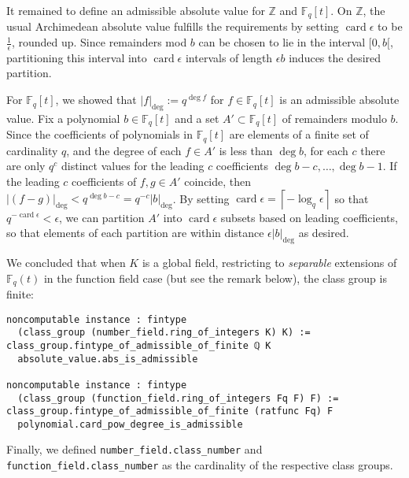 \documentclass[sn-mathphys]{sn-jnl}%
\newcommand{\lean}[1]{\texttt{#1}\xspace}
\newcommand*{\Fq}[1][q]{\mathbb{F}_{#1}}
\renewcommand{\Z}{\mathbb{Z}}
\begin{document}
It remained to define an admissible absolute value for $\Z$ and $\Fq[q][t]$. On $\Z$, the usual Archimedean absolute value fulfills the requirements
by setting $\operatorname{card} \epsilon$ to be $\frac{1}{\epsilon}$, rounded up.
Since remainders mod $b$ can be chosen to lie in the interval $[0, b[$, partitioning this interval into $\operatorname{card} \epsilon$ intervals of length $\epsilon b$ induces the desired partition.

For $\Fq[q][t]$, we showed that $\lvert f\rvert_{\deg}:=q^{\deg f}$ for $f \in \Fq[q][t]$ is an admissible absolute value.
Fix a polynomial $b \in \Fq[q][t]$ and a set $A' \subset \Fq[q][t]$ of remainders modulo $b$.
Since the coefficients of polynomials in $\Fq[q][t]$ are elements of a finite set of cardinality $q$,
and the degree of each $f \in A'$ is less than $\deg b$,
for each $c$ there are only $q^c$ distinct values for the leading $c$ coefficients $\deg b - c, \dots, \deg b - 1$.
If the leading $c$ coefficients of $f, g \in A'$ coincide, then $\lvert (f-g) \rvert_{\deg} < q^{\deg b - c} = q^{-c} \lvert b \rvert_{\deg}$.
By setting $\operatorname{card} \epsilon = \left\lceil{-\log_{q} \epsilon}\right\rceil$ so that $q^{- \operatorname{card} \epsilon} < \epsilon$,
we can partition $A'$ into $\operatorname{card} \epsilon$ subsets based on leading coefficients,
so that elements of each partition are within distance $\epsilon \lvert b \rvert_{\deg}$ as desired.

We concluded that when $K$ is a global field, restricting to \emph{separable} extensions of $\Fq[q](t)$ in the function field case (but see the remark below), the class group is finite:
\begin{lstlisting}
noncomputable instance : fintype
  (class_group (number_field.ring_of_integers K) K) :=
class_group.fintype_of_admissible_of_finite ℚ K
  absolute_value.abs_is_admissible

noncomputable instance : fintype
  (class_group (function_field.ring_of_integers Fq F) F) :=
class_group.fintype_of_admissible_of_finite (ratfunc Fq) F
  polynomial.card_pow_degree_is_admissible
\end{lstlisting}

Finally, we defined \lean{number\_field.class\_number} and \lean{function\_\-field.\linebreak[0]class\_\-number} as the cardinality of the respective class groups.
\end{document}
